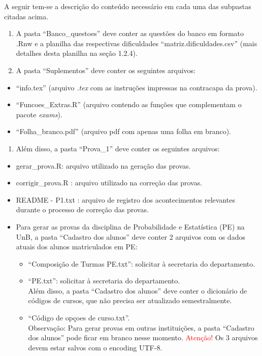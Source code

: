 \documentclass[a4paper]{report}
\providecommand{\tightlist}{%
  \setlength{\itemsep}{0pt}\setlength{\parskip}{0pt}}
\newcommand{\red}[1]{\textcolor{red}{{#1}}}
\begin{document}
A seguir tem-se a descrição do conteúdo necessário em cada uma das
subpastas citadas acima.

\begin{enumerate}
\def\labelenumi{\roman{enumi}.}
\item
  A pasta ``Banco\_questoes'' deve conter as questões do banco em
  formato .Rnw e a planilha das respectivas dificuldades
  ``matriz.dificuldades.csv'' (mais detalhes desta planilha na seção
  1.2.4).
\item
  A pasta ``Suplementos'' deve conter os seguintes arquivos:
\end{enumerate}

\begin{itemize}
\tightlist
\item
  ``info.tex'' (arquivo \emph{.tex} com as instruções impressas na
  contracapa da prova).
\item
  ``Funcoes\_Extras.R'' (arquivo contendo as funções que complementam o
  pacote \emph{exams}).
\item
  ``Folha\_branco.pdf'' (arquivo pdf com apenas uma folha em branco).
\end{itemize}

\begin{enumerate}
\def\labelenumi{\roman{enumi}.}
\setcounter{enumi}{2}
\tightlist
\item
  Além disso, a pasta ``Prova\_1'' deve conter os seguintes arquivos:
\end{enumerate}

\begin{itemize}
\tightlist
\item
  gerar\_prova.R: arquivo utilizado na geração das provas.
\item
  corrigir\_prova.R : arquivo utilizado na correção das provas.
\item
  README - P1.txt : arquivo de registro dos acontecimentos relevantes
  durante o processo de correção das provas.
\item
  Para gerar as provas da disciplina de Probabilidade e Estatística (PE)
  na UnB, a pasta ``Cadastro dos alunos'' deve conter 2 arquivos com os
  dados atuais dos alunos matriculados em PE:

  \begin{itemize}
  \tightlist
  \item
    ``Composição de Turmas PE.txt'': solicitar à secretaria do
    departamento.
  \item
    ``PE.txt'': solicitar à secretaria do departamento.\\
    Além disso, a pasta ``Cadastro dos alunos'' deve conter o dicionário
    de códigos de cursos, que não precisa ser atualizado semestralmente.
  \item
    ``Código de opçoes de curso.txt''.\\
    Observação: Para gerar provas em outras instituições, a pasta
    ``Cadastro dos alunos'' pode ficar em branco nesse momento.
    \red{Atenção!} Os 3 arquivos devem estar salvos com o encoding
    UTF-8.
  \end{itemize}
\end{itemize}
\end{document}
